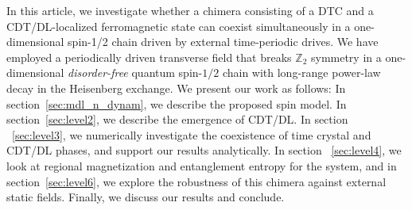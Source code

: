 \documentclass[%
nofootinbib,
reprint,
superscriptaddress,
amsmath,amssymb,showkeys,
aps,
prb,
]{revtex4-2}
\begin{document}
	In this article, we investigate whether a chimera consisting of a DTC and a CDT/DL-localized ferromagnetic state can coexist simultaneously in a one-dimensional spin-1/2 chain driven by external time-periodic drives. We have employed a periodically driven transverse field that breaks $\mathbb{Z}_2$ symmetry in a one-dimensional \textit{disorder-free} quantum spin-$1/2$ chain with long-range power-law decay in the Heisenberg exchange. We present our work as follows: In section~\ref{sec:mdl_n_dynam}, we describe the proposed spin model. In section~\ref{sec:level2}, we describe the emergence of CDT/DL. In section ~\ref{sec:level3}, we numerically investigate the coexistence of time crystal and CDT/DL phases, and support our results analytically. In section ~\ref{sec:level4}, we look at regional magnetization and  entanglement entropy for the system, and in section~\ref{sec:level6}, we explore the robustness of this chimera against  external static fields. Finally, we discuss our results and conclude.	
	
\end{document}
